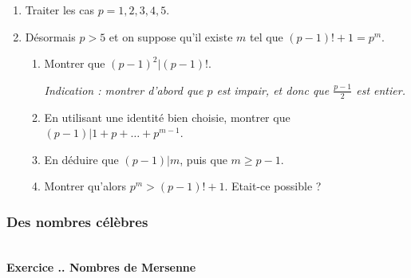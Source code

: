 \documentclass{article}
\newcounter{exo}
\newcommand{\exercice}[1][\null]{\textbf{\\ Exercice \thesection.\theexo. #1} \addtocounter{exo}{1}}
\begin{document}
\begin{enumerate}

\item Traiter les cas $p = 1,2,3,4,5$.

\item Désormais $p > 5$ et on suppose qu'il existe $m$ tel que $(p-1)! +1 = p^m$.

\begin{enumerate}

\item Montrer que $(p-1)^2 | (p-1) !$.

\emph{Indication : montrer d'abord que $p$ est impair, et donc que $\frac{p-1}{2}$ est entier.}

\item En utilisant une identité bien choisie, montrer que $(p-1) | 1+ p + \dots + p^{m-1}$.

\item En déduire que $(p-1) | m$, puis que $m \ge p-1$.

\item Montrer qu'alors $p^m > (p-1)! +1$. Etait-ce possible ?

\end{enumerate}

\end{enumerate}

\subsubsection{Des nombres célèbres}


\exercice[Nombres de Mersenne]
\end{document}
